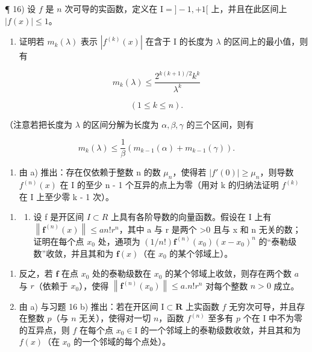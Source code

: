 ¶ 16) 设 \(f\) 是 \(n\) 次可导的实函数，定义在 \(\mathrm{I} = ] - 1, + 1[\) 上，并且在此区间上 \(|f(x)|\leqslant 1\)。

\begin{enumerate}
\def\labelenumi{\alph{enumi})}
\tightlist
\item
  证明若 \(m_k(\lambda)\) 表示 \(|f^{(k)}(x)|\) 在含于 I 的长度为 \(\lambda\) 的区间上的最小值，则有
\end{enumerate}

\[
m _ {k} (\lambda) \leqslant \frac {2 ^ {k (k + 1) / 2} k ^ {k}}{\lambda^ {k}}
\]

\[
(1 \leqslant k \leqslant n).
\]

（注意若把长度为 \(\lambda\) 的区间分解为长度为 \(\alpha, \beta, \gamma\) 的三个区间，则有

\[
m _ {k} (\lambda) \leqslant \frac {1}{\beta} (m _ {k - 1} (\alpha) + m _ {k - 1} (\gamma)).
\]

\begin{enumerate}
\def\labelenumi{\alph{enumi})}
\setcounter{enumi}{1}
\tightlist
\item
  由 a) 推出：存在仅依赖于整数 n 的数 \(\mu_{n}\)，使得若 \(|f'(0)| \geqslant \mu_{n}\)，则导数 \(f^{(n)}(x)\) 在 I 的至少 n - 1 个互异的点上为零（用对 k 的归纳法证明 \(f^{(k)}\) 在 I 上至少零 k - 1 次）。
\end{enumerate}

\begin{enumerate}
\def\labelenumi{\arabic{enumi})}
\setcounter{enumi}{16}
\tightlist
\item
  \begin{enumerate}
  \def\labelenumii{\alph{enumii})}
  \tightlist
  \item
    设 f 是开区间 \(I \subset R\) 上具有各阶导数的向量函数。假设在 I 上有 \(\left\|\mathbf{f}^{(n)}(x)\right\| \leqslant a n!r^n\)，其中 a 与 r 是两个 \textgreater0 且与 x 和 n 无关的数；证明在每个点 \(x_0\) 处，通项为 \((1/n!) \mathbf{f}^{(n)}(x_0)(x - x_0)^n\) 的“泰勒级数”收敛，并且其和为 \(\mathbf{f}(x)\)（在 \(x_0\) 的某个邻域上）。
  \end{enumerate}
\end{enumerate}

\begin{enumerate}
\def\labelenumi{\alph{enumi})}
\setcounter{enumi}{1}
\item
  反之，若 \(\mathbf{f}\) 在点 \(x_0\) 处的泰勒级数在 \(x_0\) 的某个邻域上收敛，则存在两个数 \(a\) 与 \(r\)（依赖于 \(x_0\)），使得 \(\left\| \mathbf{f}^{(n)}(x_0)\right\| \leqslant a.n!r^n\) 对每个整数 \(n > 0\) 成立。
\item
  由 a) 与习题 16 b) 推出：若在开区间 \(\mathrm{I} \subset \mathbf{R}\) 上实函数 \(f\) 无穷次可导，并且存在整数 \(p\)（与 \(n\) 无关），使得对一切 \(n\)，函数 \(f^{(n)}\) 至多有 \(p\) 个在 \(\mathrm{I}\) 中不为零的互异点，则 \(f\) 在每个点 \(x_0 \in \mathrm{I}\) 的一个邻域上的泰勒级数收敛，并且其和为 \(f(x)\)（在 \(x_0\) 的一个邻域的每个点处）。
\end{enumerate}


